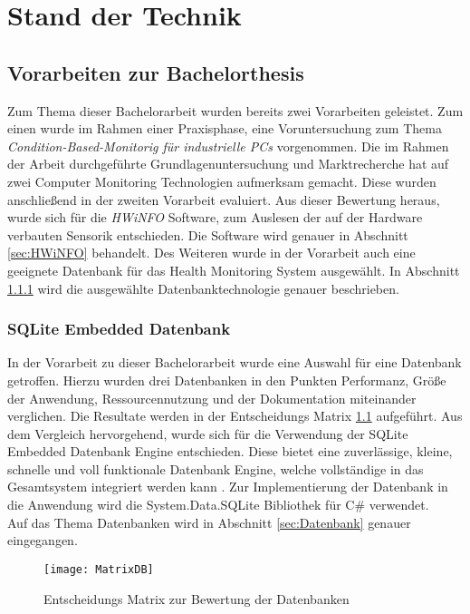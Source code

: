 \chapter{Stand der Technik}
\section{Vorarbeiten zur Bachelorthesis}
Zum Thema dieser Bachelorarbeit wurden bereits zwei Vorarbeiten geleistet. Zum einen wurde im Rahmen einer Praxisphase, eine Voruntersuchung zum Thema \textit{Condition-Based-Monitorig für industrielle PCs}  vorgenommen. Die im Rahmen der Arbeit \cite{PAMathias} durchgeführte Grundlagenuntersuchung und Marktrecherche hat auf zwei Computer Monitoring Technologien aufmerksam gemacht. Diese wurden anschließend in der zweiten Vorarbeit \cite{t3000} evaluiert. Aus dieser Bewertung heraus, wurde sich für die \textit{HWiNFO} Software, zum Auslesen der auf der Hardware verbauten Sensorik entschieden. Die Software wird genauer in Abschnitt \ref{sec:HWiNFO} behandelt. Des Weiteren wurde in der Vorarbeit \cite{t3000} auch eine geeignete Datenbank für das Health Monitoring System ausgewählt. In Abschnitt \ref{sec:SQLite} wird die ausgewählte Datenbanktechnologie genauer beschrieben. 

\subsection{SQLite Embedded Datenbank}\label{sec:SQLite}
In der Vorarbeit \cite{t3000} zu dieser Bachelorarbeit wurde eine Auswahl für eine Datenbank getroffen. Hierzu wurden drei Datenbanken in den Punkten Performanz, Größe der Anwendung, Ressourcennutzung und der Dokumentation miteinander verglichen. Die Resultate werden in der Entscheidungs Matrix \ref{fig:MatrixDB} aufgeführt. Aus dem Vergleich  hervorgehend, wurde sich für die Verwendung der SQLite Embedded Datenbank Engine entschieden. Diese bietet eine zuverlässige, kleine, schnelle und voll funktionale Datenbank Engine, welche vollständige in das Gesamtsystem integriert werden kann \cite{SQLiteHompage}. Zur Implementierung der Datenbank in die Anwendung wird die System.Data.SQLite Bibliothek für C\# verwendet.\\ 
Auf das Thema Datenbanken wird in Abschnitt \ref{sec:Datenbank} genauer eingegangen.
\begin{flushleft}
    \begin{figure}[h!]
        \centering
        \texttt{[image: MatrixDB]}
        \caption{Entscheidungs Matrix zur Bewertung der Datenbanken \cite{t3000}}
        \label{fig:MatrixDB}
    \end{figure}
\end{flushleft}
\vspace{-2cm}
